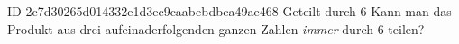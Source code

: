 \begin{exercise}
      {ID-2c7d30265d014332e1d3ec9caabebdbca49ae468}
      {Geteilt durch 6}
  \ifproblem\problem
    Kann man das Produkt aus drei aufeinaderfolgenden ganzen Zahlen
    \emph{immer} durch 6 teilen?
  \fi
\end{exercise}

